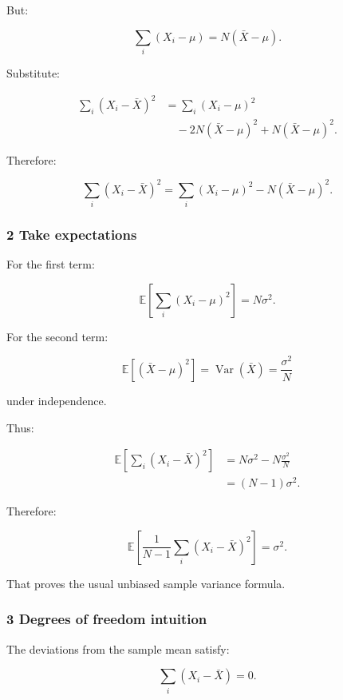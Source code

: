 But:

\[
 \sum_i(X_i-\mu)=N(\bar X-\mu).
\]

Substitute:

\[
 \begin{aligned} \sum_i(X_i-\bar X)^2 &= \sum_i(X_i-\mu)^2\\ &\quad-2N(\bar X-\mu)^2 +N(\bar X-\mu)^2. \end{aligned}
\]

Therefore:

\[
 \boxed{ \sum_i(X_i-\bar X)^2 = \sum_i(X_i-\mu)^2 - N(\bar X-\mu)^2 }.
\]

\subsubsection{2 Take expectations}\label{02-foundations-ii-ch030-take-expectations}

\hypertarget{02-foundations-ii-ch030-take-expectations}{}

For the first term:

\[
 \mathbb E\left[ \sum_i(X_i-\mu)^2 \right] =N\sigma^2.
\]

For the second term:

\[
 \mathbb E[(\bar X-\mu)^2] = \operatorname{Var}(\bar X) = \frac{\sigma^2}{N}
\]

under independence.

Thus:

\[
 \begin{aligned} \mathbb E\left[ \sum_i(X_i-\bar X)^2 \right] &= N\sigma^2- N\frac{\sigma^2}{N}\\ &=(N-1)\sigma^2. \end{aligned}
\]

Therefore:

\[
 \boxed{ \mathbb E\left[ \frac1{N-1} \sum_i(X_i-\bar X)^2 \right] = \sigma^2 }.
\]

That proves the usual unbiased sample variance formula.

\subsubsection{3 Degrees of freedom intuition}\label{02-foundations-ii-ch030-degrees-of-freedom-intuition}

\hypertarget{02-foundations-ii-ch030-degrees-of-freedom-intuition}{}

The deviations from the sample mean satisfy:

\[
 \sum_i(X_i-\bar X)=0.
\]

